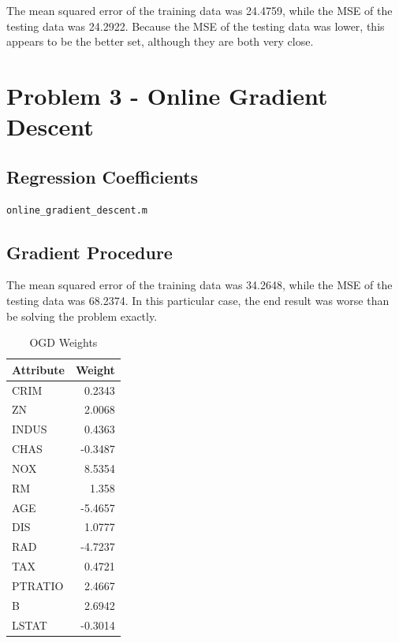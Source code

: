 \documentclass[12pt, letterpaper]{report}
\begin{document}
The mean squared error of the training data was 24.4759, while the MSE of the testing data was 24.2922. Because the MSE of the testing data was lower, this appears to be the better set, although they are both very close.

\section{Problem 3 - Online Gradient Descent}

\subsection{Regression Coefficients}

\begin{verbatim}
online_gradient_descent.m
\end{verbatim}

\subsection{Gradient Procedure}

The mean squared error of the training data was 34.2648, while the MSE of the testing data was 68.2374. In this particular case, the end result was worse than be solving the problem exactly.

\begin{table}[H]
	\centering
	\begin{tabular}{ |l|r| }
		\hline
		Attribute & Weight \\
		\hline
		CRIM & 0.2343 \\
		\hline
		ZN & 2.0068 \\
		\hline
		INDUS & 0.4363 \\
		\hline
		CHAS & -0.3487 \\
		\hline
		NOX & 8.5354 \\
		\hline
		RM & 1.358 \\
		\hline
		AGE & -5.4657 \\
		\hline
		DIS & 1.0777 \\
		\hline
		RAD & -4.7237 \\
		\hline
		TAX & 0.4721 \\
		\hline
		PTRATIO & 2.4667 \\
		\hline
		B & 2.6942 \\
		\hline
		LSTAT & -0.3014 \\
		\hline
	\end{tabular}
	\caption{OGD Weights}
\end{table}
\end{document}
